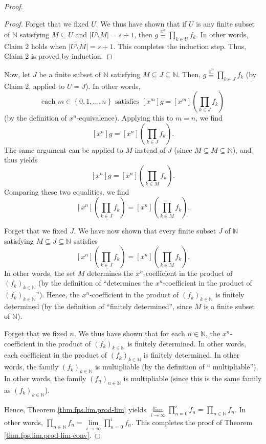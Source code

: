 \begin{fineprint}
\begin{proof}
\begin{proof}
Forget that we fixed $U$. We thus have shown that if $U$ is any finite subset
of $\mathbb{N}$ satisfying $M\subseteq U$ and $\left\vert U\setminus
M\right\vert =s+1$, then $g\overset{x^{n}}{\equiv}\prod_{k\in U}f_{k}$. In
other words, Claim 2 holds when $\left\vert U\setminus M\right\vert =s+1$.
This completes the induction step. Thus, Claim 2 is proved by induction.
\end{proof}

Now, let $J$ be a finite subset of $\mathbb{N}$ satisfying $M\subseteq
J\subseteq\mathbb{N}$. Then, $g\overset{x^{n}}{\equiv}\prod_{k\in J}f_{k}$ (by
Claim 2, applied to $U=J$). In other words,%
\[
\text{each }m\in\left\{  0,1,\ldots,n\right\}  \text{ satisfies }\left[
x^{m}\right]  g=\left[  x^{m}\right]  \left(  \prod_{k\in J}f_{k}\right)
\]
(by the definition of $x^{n}$-equivalence). Applying this to $m=n$, we find%
\[
\left[  x^{n}\right]  g=\left[  x^{n}\right]  \left(  \prod_{k\in J}%
f_{k}\right)  .
\]
The same argument can be applied to $M$ instead of $J$ (since $M\subseteq
M\subseteq\mathbb{N}$), and thus yields%
\[
\left[  x^{n}\right]  g=\left[  x^{n}\right]  \left(  \prod_{k\in M}%
f_{k}\right)  .
\]
Comparing these two equalities, we find
\[
\left[  x^{n}\right]  \left(  \prod_{k\in J}f_{k}\right)  =\left[
x^{n}\right]  \left(  \prod_{k\in M}f_{k}\right)  .
\]


Forget that we fixed $J$. We have now shown that every finite subset $J$ of
$\mathbb{N}$ satisfying $M\subseteq J\subseteq\mathbb{N}$ satisfies%
\[
\left[  x^{n}\right]  \left(  \prod_{k\in J}f_{k}\right)  =\left[
x^{n}\right]  \left(  \prod_{k\in M}f_{k}\right)  .
\]
In other words, the set $M$ determines the $x^{n}$-coefficient in the product
of $\left(  f_{k}\right)  _{k\in\mathbb{N}}$ (by the definition of
\textquotedblleft determines the $x^{n}$-coefficient in the product of
$\left(  f_{k}\right)  _{k\in\mathbb{N}}$\textquotedblright). Hence, the
$x^{n}$-coefficient in the product of $\left(  f_{k}\right)  _{k\in\mathbb{N}%
}$ is finitely determined (by the definition of \textquotedblleft finitely
determined\textquotedblright, since $M$ is a finite subset of $\mathbb{N}$).

Forget that we fixed $n$. We thus have shown that for each $n\in\mathbb{N}$,
the $x^{n}$-coefficient in the product of $\left(  f_{k}\right)
_{k\in\mathbb{N}}$ is finitely determined. In other words, each coefficient in
the product of $\left(  f_{k}\right)  _{k\in\mathbb{N}}$ is finitely
determined. In other words, the family $\left(  f_{k}\right)  _{k\in
\mathbb{N}}$ is multipliable (by the definition of \textquotedblleft
multipliable\textquotedblright). In other words, the family $\left(
f_{n}\right)  _{n\in\mathbb{N}}$ is multipliable (since this is the same
family as $\left(  f_{k}\right)  _{k\in\mathbb{N}}$).

Hence, Theorem \ref{thm.fps.lim.prod-lim} yields $\lim\limits_{i\rightarrow
\infty}\prod_{n=0}^{i}f_{n}=\prod_{n\in\mathbb{N}}f_{n}$. In other words,
$\prod_{n\in\mathbb{N}}f_{n}=\lim\limits_{i\rightarrow\infty}\prod_{n=0}%
^{i}f_{n}$. This completes the proof of Theorem
\ref{thm.fps.lim.prod-lim-conv}.
\end{proof}
\end{fineprint}
